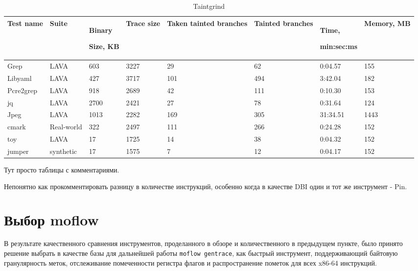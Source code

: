 \begin{longtable}[]{@{}llllllll@{}}
\caption{Taintgrind} \label{tab:c1}\\
\toprule
\begin{minipage}[b]{0.12\columnwidth}\raggedright\strut
Test name\strut
\end{minipage} & \begin{minipage}[b]{0.12\columnwidth}\raggedright\strut
Suite\strut
\end{minipage} & \begin{minipage}[b]{0.12\columnwidth}\raggedright\strut
Binary

Size, KB\strut
\end{minipage} & \begin{minipage}[b]{0.12\columnwidth}\raggedright\strut
Trace size\strut
\end{minipage} & \begin{minipage}[b]{0.12\columnwidth}\raggedright\strut
Taken tainted branches\strut
\end{minipage} & \begin{minipage}[b]{0.12\columnwidth}\raggedright\strut
Tainted branches\strut
\end{minipage} & \begin{minipage}[b]{0.12\columnwidth}\raggedright\strut
Time,

min:sec:ms\strut
\end{minipage} & \begin{minipage}[b]{0.12\columnwidth}\raggedright\strut
Memory, MB\strut
\end{minipage}\tabularnewline
\midrule
\endhead
Grep & LAVA & 603 & 3227 & 29 & 62 & 0:04.57 & 155\tabularnewline
Libyaml & LAVA & 427 & 3717 & 101 & 494 & 3:42.04 & 182\tabularnewline
Pcre2grep & LAVA & 918 & 2689 & 42 & 111 & 0:10.30~ & 153\tabularnewline
jq & LAVA & 2700 & 2421 & 27 & 78 & 0:31.64 & 124\tabularnewline
Jpeg & LAVA & 1013 & 2282 & 169 & 305 & 31:34.51 & 1443\tabularnewline
cmark & Real-world & 322 & 2497 & 111 & 266 & 0:24.28~ &
152\tabularnewline
toy & LAVA & 17 & 1725 & 14 & 38 & 0:04.32 & 152\tabularnewline
jumper & synthetic & 17 & 1575 & 7 & 12 & 0:04.17~ & 152\tabularnewline
\bottomrule
\end{longtable}

Тут просто таблицы с комментариями.

Непонятно как прокомментировать разницу в количестве инструкций, особенно когда в качестве DBI один и тот же инструмент - Pin.

\section{Выбор moflow}

В результате качественного сравнения инструментов, проделанного в обзоре и количественного в предыдущем пункте, было принято решение выбрать в качестве базы для дальнейшей работы \texttt{moflow gentrace}, как быстрый инструмент, поддерживающий байтовую гранулярность меток, отслеживание помеченности регистра флагов и распространение пометок для всех x86-64 инструкций.

